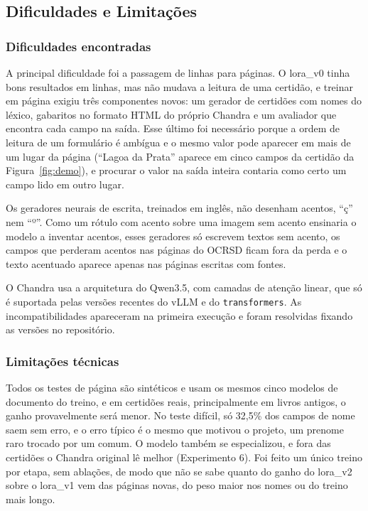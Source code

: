 \documentclass[12pt,a4paper]{article}
\begin{document}
\subsection{Dificuldades e Limitações}

\subsubsection{Dificuldades encontradas}
A principal dificuldade foi a passagem de linhas para páginas. O lora\_v0 tinha bons resultados em linhas, mas não mudava a leitura de uma certidão, e treinar em página exigiu três componentes novos: um gerador de certidões com nomes do léxico, gabaritos no formato HTML do próprio Chandra e um avaliador que encontra cada campo na saída. Esse último foi necessário porque a ordem de leitura de um formulário é ambígua e o mesmo valor pode aparecer em mais de um lugar da página (``Lagoa da Prata'' aparece em cinco campos da certidão da Figura~\ref{fig:demo}), e procurar o valor na saída inteira contaria como certo um campo lido em outro lugar.

Os geradores neurais de escrita, treinados em inglês, não desenham acentos, ``ç'' nem ``º''. Como um rótulo com acento sobre uma imagem sem acento ensinaria o modelo a inventar acentos, esses geradores só escrevem textos sem acento, os campos que perderam acentos nas páginas do OCRSD ficam fora da perda e o texto acentuado aparece apenas nas páginas escritas com fontes.

O Chandra usa a arquitetura do Qwen3.5, com camadas de atenção linear, que só é suportada pelas versões recentes do vLLM e do \texttt{transformers}. As incompatibilidades apareceram na primeira execução e foram resolvidas fixando as versões no repositório.

\subsubsection{Limitações técnicas}
Todos os testes de página são sintéticos e usam os mesmos cinco modelos de documento do treino, e em certidões reais, principalmente em livros antigos, o ganho provavelmente será menor. No teste difícil, só 32,5\% dos campos de nome saem sem erro, e o erro típico é o mesmo que motivou o projeto, um prenome raro trocado por um comum. O modelo também se especializou, e fora das certidões o Chandra original lê melhor (Experimento 6). Foi feito um único treino por etapa, sem ablações, de modo que não se sabe quanto do ganho do lora\_v2 sobre o lora\_v1 vem das páginas novas, do peso maior nos nomes ou do treino mais longo.
\end{document}
